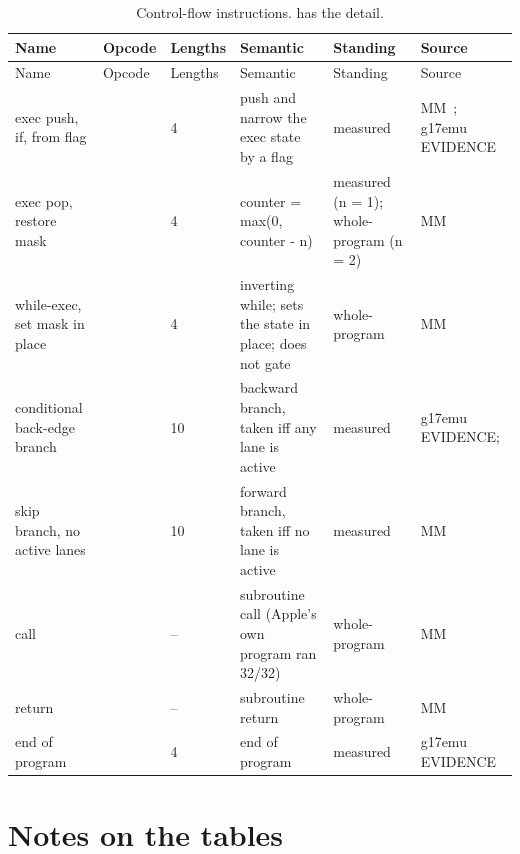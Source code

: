 \widetable
\begin{xltabular}{\linewidth}{@{}>{\hsize}Xll>{\hsize}X>{\hsize}X>{\hsize}X@{}}
\caption{Control-flow instructions.  has the detail.}\label{tab:scalar-control-flow}\\
\toprule
Name & Opcode & Lengths & Semantic & Standing & Source \\
\midrule
\endfirsthead
{}
\toprule
Name & Opcode & Lengths & Semantic & Standing & Source \\
\midrule
\endhead
exec push, if, from flag &  & 4 & push and narrow the exec state by a flag & measured & MM~; g17emu EVIDENCE \\*
exec pop, restore mask &  & 4 & counter = max(0, counter - n) & measured (n = 1); whole-program (n = 2) & MM~ \\*
while-exec, set mask in place &  & 4 & inverting while; sets the state in place; does not gate  & whole-program & MM~ \\*
conditional back-edge branch &  & 10 & backward branch, taken iff any lane is active & measured & g17emu EVIDENCE;  \\*
skip branch, no active lanes &  & 10 & forward branch, taken iff no lane is active & measured & MM~ \\*
call &  & – & subroutine call (Apple's own program ran 32/32) & whole-program & MM~ \\*
return &  & – & subroutine return & whole-program & MM~ \\*
end of program &  & 4 & end of program & measured & g17emu EVIDENCE \\*
\bottomrule
\end{xltabular}

\section{Notes on the tables}\label{sec:notes-table}

